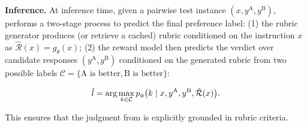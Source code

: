 \noindent \textbf{Inference.}
At inference time, given a pairwise test instance $(x, y^{\text{A}}, y^{\text{B}})$,  
\modelname{} performs a two-stage process to predict the final preference label:
(1) the rubric generator produces (or retrieve a cached) rubric conditioned on the instruction $x$ as $\hat{\mathcal{R}}(x) = g_\theta(x)$; (2) the reward model then predicts the verdict over candidate responses $(y^{\text{A}}, y^{\text{B}})$ conditioned on the generated rubric from two possible labels $\mathcal{C} = \{\text{A is better}, \text{B is better}\}$:

% 
\begin{small}
\begin{equation}
\setlength{\abovedisplayskip}{4pt}
\setlength{\belowdisplayskip}{5pt}
\hat{l}
= \arg\max_{k \in \mathcal{C}}
p_\phi \big(k \mid x, y^{\text{A}}, y^{\text{B}}, \hat{\mathcal{R}}(x)\big).
\nonumber
\end{equation}
\end{small}
This ensures that the judgment from \modelname{} is explicitly grounded in rubric criteria.




